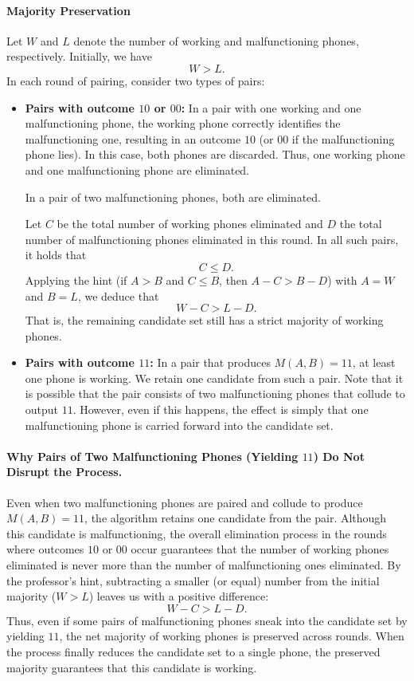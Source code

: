\documentclass[11pt]{article}
\begin{document}
    \paragraph{Majority Preservation}
    Let $W$ and $L$ denote the number of working and malfunctioning phones, respectively. Initially, we have
    \[
    W > L.
    \]
    In each round of pairing, consider two types of pairs:
    \begin{itemize}
        \item \textbf{Pairs with outcome $10$ or $00$:}  
        In a pair with one working and one malfunctioning phone, the working phone correctly identifies the malfunctioning one, resulting in an outcome $10$ (or $00$ if the malfunctioning phone lies). In this case, both phones are discarded. Thus, one working phone and one malfunctioning phone are eliminated.
        
        In a pair of two malfunctioning phones, both are eliminated.
        
        Let $C$ be the total number of working phones eliminated and $D$ the total number of malfunctioning phones eliminated in this round. In all such pairs, it holds that 
        \[
        C \leq D.
        \]
        Applying the hint (if $A>B$ and $C\leq B$, then $A-C > B-D$) with $A=W$ and $B=L$, we deduce that 
        \[
        W - C > L - D.
        \]
        That is, the remaining candidate set still has a strict majority of working phones.
        
        \item \textbf{Pairs with outcome $11$:}  
        In a pair that produces $M(A,B)=11$, at least one phone is working. We retain one candidate from such a pair. Note that it is possible that the pair consists of two malfunctioning phones that collude to output $11$. However, even if this happens, the effect is simply that one malfunctioning phone is carried forward into the candidate set.
    \end{itemize}
    
    \paragraph{Why Pairs of Two Malfunctioning Phones (Yielding $11$) Do Not Disrupt the Process.}
    Even when two malfunctioning phones are paired and collude to produce $M(A,B)=11$, the algorithm retains one candidate from the pair. Although this candidate is malfunctioning, the overall elimination process in the rounds where outcomes $10$ or $00$ occur guarantees that the number of working phones eliminated is never more than the number of malfunctioning ones eliminated. By the professor's hint, subtracting a smaller (or equal) number from the initial majority ($W > L$) leaves us with a positive difference:
    \[
    W - C > L - D.
    \]
    Thus, even if some pairs of malfunctioning phones sneak into the candidate set by yielding $11$, the net majority of working phones is preserved across rounds. When the process finally reduces the candidate set to a single phone, the preserved majority guarantees that this candidate is working.
    
\end{document}
